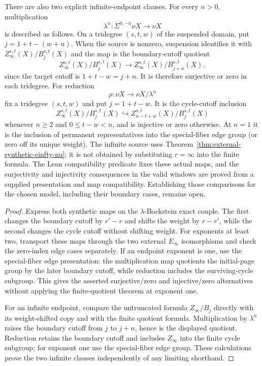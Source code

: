 \begin{proposition}
  There are also two explicit infinite-endpoint clauses.  For every $n>0$,
  multiplication
  \[
    \lambda^n:\Sigma^{0,-n}\nu X\longrightarrow\nu X
  \]
  is described as follows.  On a tridegree $(s,t,w)$ of the suspended domain,
  put $j=1+t-(w+n)$.  When the source is nonzero, suspension identifies it
  with $Z_\infty^{s,t}(X)/B_j^{s,t}(X)$ and the map is the
  boundary-cutoff quotient
  \[
    Z_\infty^{s,t}(X)/B_j^{s,t}(X)
      \longrightarrow
    Z_\infty^{s,t}(X)/B_{j+n}^{s,t}(X),
  \]
  since the target cutoff is $1+t-w=j+n$.  It is therefore surjective or zero
  in each tridegree.  For reduction
  \[
    \rho:\nu X\longrightarrow\nu X/\lambda^n
  \]
  fix a tridegree $(s,t,w)$ and put $j=1+t-w$.  It is the cycle-cutoff inclusion
  \[
    Z_\infty^{s,t}(X)/B_j^{s,t}(X)
      \hookrightarrow
    Z_{n-t+w}^{s,t}(X)/B_j^{s,t}(X)
  \]
  whenever $n\ge2$ and $0\le t-w<n$, and is injective or zero otherwise.  At
  $n=1$ it is the inclusion of permanent representatives
  into the special-fiber edge group (or zero off its unique weight).  The
  infinite source uses Theorem~\ref{thm:external-synthetic-einfty-nu}; it is
  not obtained by substituting $r=\infty$ into the finite formula.
  The Lean compatibility predicate fixes these actual maps, and the
  surjectivity and injectivity consequences in the valid windows are
  proved from a supplied presentation and map compatibility. Establishing
  those comparisons for the chosen model, including their boundary
  cases, remains open.
\end{proposition}

\begin{proof}
  Express both synthetic maps on the $\lambda$-Bockstein exact couple.  The
  first changes the boundary cutoff by $r'-r$ and shifts the weight by
  $r-r'$, while the second changes the cycle cutoff without shifting weight.
  For exponents at least two, transport these maps through the two external
  $E_\infty$ isomorphisms and check the zero-index edge cases separately.  If
  an endpoint exponent is one, use the special-fiber edge presentation: the
  multiplication map quotients the initial-page group by the later boundary
  cutoff, while reduction includes the surviving-cycle subgroup.  This gives
  the asserted surjective/zero and injective/zero alternatives without
  applying the finite-quotient theorem at exponent one.

  For an infinite endpoint, compare the untruncated formula
  $Z_\infty/B_j$ directly with its weight-shifted copy and with the finite
  quotient formula.  Multiplication by $\lambda^n$ raises the boundary cutoff
  from $j$ to $j+n$, hence is the displayed quotient.  Reduction retains the
  boundary cutoff and includes $Z_\infty$ into the finite cycle subgroup; for
  exponent one use the special-fiber edge group.  These calculations prove
  the two infinite clauses independently of any limiting shorthand.
\end{proof}

